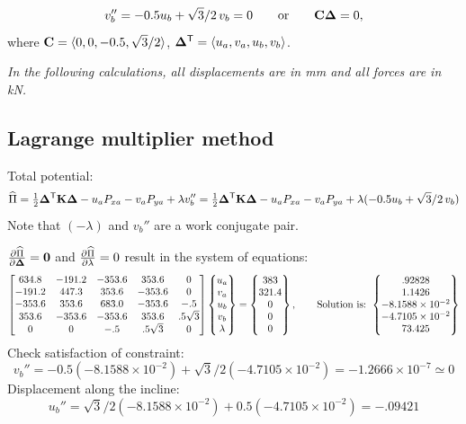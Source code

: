 \begin{example}
\leavevmode
\begin{fig}
  
\end{fig}
\begin{equation*}
  v_b'' = -0.5u_b + \sqrt3/2\,v_b = 0\qquad\text{or}\qquad \mathbf{C}\bm{\Delta} = 0,
\end{equation*}
where $\mathbf{C} = \langle 0, 0, -0.5, \sqrt3/2\rangle$, $\bm{\Delta}^{\mathsf{T}} = \langle u_a, v_a, u_b, v_b\rangle$.

\emph{In the following calculations, all displacements are in mm and all forces are in kN.}

\subsection*{Lagrange multiplier method}
Total potential:
\begin{equation*}
  \widehat\Pi = \tfrac12\bm{\Delta}^{\mathsf{T}}\mathbf{K}\bm{\Delta} - u_aP_{xa} - v_aP_{ya} + \lambda v_b''
  = \tfrac12\bm{\Delta}^{\mathsf{T}}\mathbf{K}\bm{\Delta} - u_aP_{xa} - v_aP_{ya} + \lambda(-0.5u_b + \sqrt3/2\,v_b)
\end{equation*}
Note that $(-\lambda)$ and $v_b''$ are a work conjugate pair.

$\frac{\partial \widehat\Pi}{\partial \bm{\Delta}} = \mathbf{0}$ and $\frac{\partial \widehat\Pi}{\partial \lambda} = 0$ result in the system of equations:
{\small\begin{equation*}
  \begin{bmatrix}634.8 & -191.2 & -353.6 & 353.6 & 0\\ -191.2 & 447.3 & 353.6 & -353.6 & 0\\ -353.6 & 353.6 & 683.0 & -353.6 & -.5\\ 353.6 & -353.6 & -353.6 & 353.6 & .5\sqrt3\\ 0 & 0 & -.5 & .5\sqrt3 & 0\end{bmatrix}
  \begin{Bmatrix}u_a\\ v_a\\ u_b\\ v_b\\ \lambda\end{Bmatrix} = \begin{Bmatrix}383\\ 321.4\\ 0\\ 0\\ 0\end{Bmatrix},\qquad
  \text{Solution is: }\begin{Bmatrix}.92828\\ 1.1426\\ -8.1588\times10^{-2}\\ -4.7105\times10^{-2}\\ 73.425\end{Bmatrix}
\end{equation*}}
Check satisfaction of constraint:
\begin{equation*}
  v_b'' = -0.5(-8.1588\times10^{-2}) + \sqrt3/2(-4.7105\times10^{-2}) = -1.2666\times10^{-7}\simeq 0
\end{equation*}
Displacement along the incline:
\begin{equation*}
  u_b'' = \sqrt3/2(-8.1588\times10^{-2}) + 0.5(-4.7105\times10^{-2}) = -.09421
\end{equation*}


\end{example}
